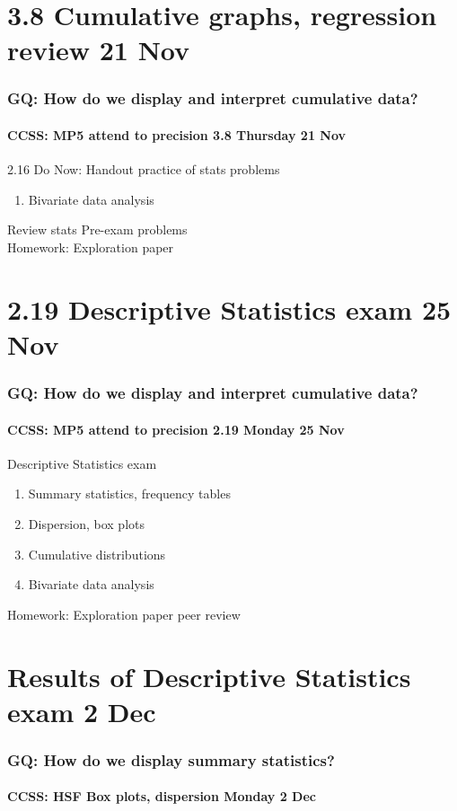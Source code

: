 \documentclass{beamer}
\begin{document}
\section{3.8 Cumulative graphs, regression review 21 Nov}
\frame
{
  \frametitle{GQ: How do we display and interpret cumulative data?}
  \framesubtitle{CCSS: MP5 attend to precision \hfill \alert{3.8 Thursday 21 Nov}}

  \begin{block}{2.16 Do Now: Handout practice of stats problems}
  \begin{enumerate}
      \item Bivariate data analysis
  \end{enumerate}
  \end{block}
  Review stats Pre-exam problems \\
  Homework: Exploration paper
}

\section{2.19 Descriptive Statistics exam 25 Nov}
\frame
{
  \frametitle{GQ: How do we display and interpret cumulative data?}
  \framesubtitle{CCSS: MP5 attend to precision \hfill \alert{2.19 Monday 25 Nov}}

  \begin{block}{Descriptive Statistics exam}
  \begin{enumerate}
    \item Summary statistics, frequency tables
    \item Dispersion, box plots
    \item Cumulative distributions
    \item Bivariate data analysis
  \end{enumerate}
  \end{block}
  Homework: Exploration paper peer review
}

\section{Results of Descriptive Statistics exam 2 Dec}
\frame
{
  \frametitle{GQ: How do we display summary statistics?}
  \framesubtitle{CCSS: HSF Box plots, dispersion \hfill \alert{Monday 2 Dec}}


  }
\end{document}
